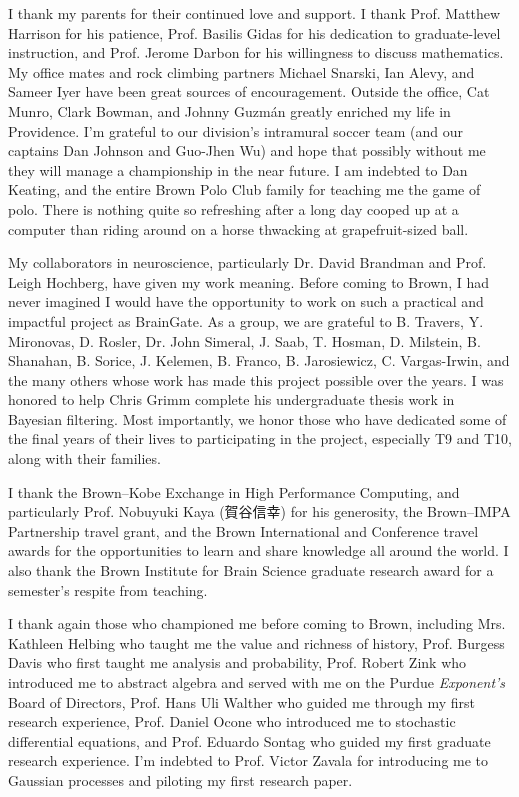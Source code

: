 
I thank my parents for their continued love and support. I thank Prof. Matthew Harrison for his patience, Prof. Basilis Gidas for his dedication to graduate-level instruction, and Prof. Jerome Darbon for his willingness to discuss mathematics.  My office mates and rock climbing partners Michael Snarski, Ian Alevy, and Sameer Iyer have been great sources of encouragement.  Outside the office, Cat Munro, Clark Bowman, and Johnny Guzm\'an greatly enriched my life in Providence.  I'm grateful to our division's intramural soccer team (and our captains Dan Johnson and Guo-Jhen Wu) and hope that possibly without me they will manage a championship in the near future.  I am indebted to Dan Keating, and the entire Brown Polo Club family for teaching me the game of polo.  There is nothing quite so refreshing after a long day cooped up at a computer than riding around on a horse thwacking at grapefruit-sized ball.
   
My collaborators in neuroscience, particularly Dr. David Brandman and Prof. Leigh Hochberg, have given my work meaning.  Before coming to Brown, I had never imagined I would have the opportunity to work on such a practical and impactful project as BrainGate.  As a group, we are grateful to B. Travers, Y. Mironovas, D. Rosler, Dr. John Simeral, J. Saab, T. Hosman, D. Milstein, B. Shanahan, B. Sorice, J. Kelemen, B. Franco, B. Jarosiewicz, C. Vargas-Irwin, and the many others whose work has made this project possible over the years.  I was honored to help Chris Grimm complete his undergraduate thesis work in Bayesian filtering. Most importantly, we honor those who have dedicated some of the final years of their lives to participating in the project, especially T9 and T10, along with their families.
   
I thank the Brown--Kobe Exchange in High Performance Computing, and particularly Prof. Nobuyuki Kaya (\foreignlanguage{japanese}{\TenMincho\small 賀谷\;信幸}) for his generosity, the Brown--IMPA Partnership travel grant, and the Brown International and Conference travel awards for the opportunities to learn and share knowledge all around the world.  I also thank the Brown Institute for Brain Science graduate research award for a semester's respite from teaching.
   
I thank again those who championed me before coming to Brown, including Mrs. Kathleen Helbing who taught me the value and richness of history, Prof. Burgess Davis who first taught me analysis and probability, Prof. Robert Zink who introduced me to abstract algebra and served with me on the Purdue \emph{Exponent's} Board of Directors, Prof. Hans Uli Walther who guided me through my first research experience, Prof. Daniel Ocone who introduced me to stochastic differential equations, and Prof. Eduardo Sontag who guided my first graduate research experience.  I'm indebted to Prof. Victor Zavala for introducing me to Gaussian processes and piloting my first research paper.

